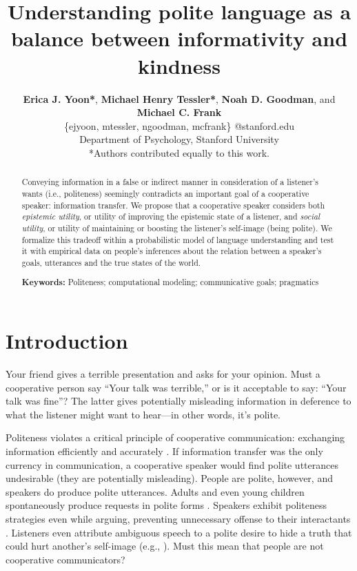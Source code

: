 \documentclass[10pt,letterpaper]{article}
\title{Understanding polite language as a balance between informativity and kindness}
\author{ {\large \bf Erica J. Yoon*}, {\large \bf Michael Henry Tessler*}, {\large \bf Noah D. Goodman}, and {\large \bf Michael C. Frank}   \\
\{ejyoon, mtessler, ngoodman, mcfrank\} @stanford.edu \\
  Department of Psychology, Stanford University \\
  *Authors contributed equally to this work.}
\begin{document}
\maketitle


\begin{abstract}

Conveying information in a false or indirect manner in consideration of a listener's wants (i.e., politeness)
seemingly contradicts an important goal of a cooperative speaker: information transfer.
We propose that a cooperative speaker considers both
\emph{epistemic utility}, or utility of improving the epistemic state of a listener,
and \emph{social utility}, or utility of maintaining or boosting the listener's self-image (being polite).
We formalize this tradeoff within a probabilistic model of language understanding and test it with empirical data on people's inferences about the relation between a speaker's goals, utterances and the true states of the world.

\textbf{Keywords:}
Politeness; computational modeling; communicative goals; pragmatics

\end{abstract}


\section{Introduction}
Your friend gives a terrible presentation and asks for your opinion.
Must a cooperative person say ``Your talk was terrible,'' or is it acceptable to say: ``Your talk was fine''?
The latter gives potentially misleading information in deference to what the listener might want to hear---in other words, it's polite.

Politeness violates a critical principle of cooperative communication: exchanging information efficiently and accurately \cite{Grice1975}.
If information transfer was the only currency in communication, a cooperative speaker would find polite utterances undesirable (they are potentially misleading).
People are polite, however, and speakers do produce polite utterances.
Adults and even young children spontaneously produce requests in polite forms \cite{clark1980, axia1985}.
Speakers exhibit politeness strategies even while arguing, preventing unnecessary offense to their interactants \cite{holtgraves1997}.
Listeners even attribute ambiguous speech to a polite desire to hide a truth that could hurt another's self-image (e.g., ).
Must this mean that people are not cooperative communicators?
\end{document}
